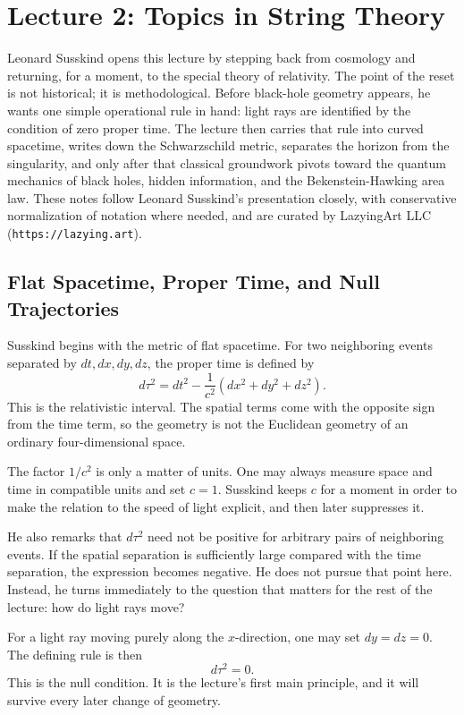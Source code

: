 \chapter{Lecture 2: Topics in String Theory}

Leonard Susskind opens this lecture by stepping back from cosmology and returning, for a moment, to the special theory of relativity. The point of the reset is not historical; it is methodological. Before black-hole geometry appears, he wants one simple operational rule in hand: light rays are identified by the condition of zero proper time. The lecture then carries that rule into curved spacetime, writes down the Schwarzschild metric, separates the horizon from the singularity, and only after that classical groundwork pivots toward the quantum mechanics of black holes, hidden information, and the Bekenstein-Hawking area law. These notes follow Leonard Susskind's presentation closely, with conservative normalization of notation where needed, and are curated by LazyingArt LLC (\texttt{https://lazying.art}).

\section{Flat Spacetime, Proper Time, and Null Trajectories}

Susskind begins with the metric of flat spacetime. For two neighboring events separated by \(dt,dx,dy,dz\), the proper time is defined by
\begin{equation}
d\tau^2 = dt^2 - \frac{1}{c^2}\left(dx^2+dy^2+dz^2\right).
\end{equation}
This is the relativistic interval. The spatial terms come with the opposite sign from the time term, so the geometry is not the Euclidean geometry of an ordinary four-dimensional space.

The factor \(1/c^2\) is only a matter of units. One may always measure space and time in compatible units and set \(c=1\). Susskind keeps \(c\) for a moment in order to make the relation to the speed of light explicit, and then later suppresses it.

He also remarks that \(d\tau^2\) need not be positive for arbitrary pairs of neighboring events. If the spatial separation is sufficiently large compared with the time separation, the expression becomes negative. He does not pursue that point here. Instead, he turns immediately to the question that matters for the rest of the lecture: how do light rays move?

For a light ray moving purely along the \(x\)-direction, one may set \(dy=dz=0\). The defining rule is then
\begin{equation}
d\tau^2 = 0.
\end{equation}
This is the null condition. It is the lecture's first main principle, and it will survive every later change of geometry.

